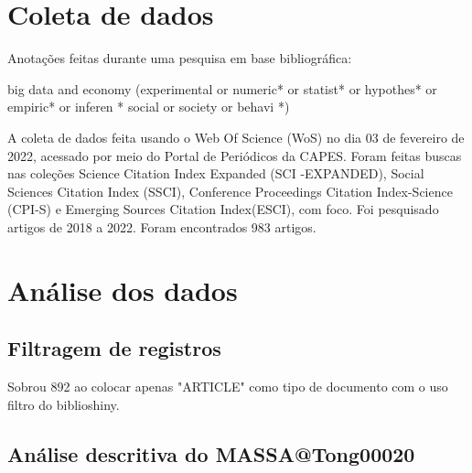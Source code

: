 \section{Coleta de dados}

Anotações feitas durante uma pesquisa em base bibliográfica:

big data and economy (experimental  or  numeric* or  statist* or  hypothes* or  empiric* or  inferen * social  or  society  or  behavi *)

A coleta de dados feita usando o Web Of Science (WoS) no dia 03 de fevereiro de 2022, acessado por meio do Portal de Periódicos da CAPES. Foram feitas buscas nas coleções Science  Citation  Index  Expanded (SCI -EXPANDED), Social Sciences  Citation  Index (SSCI), Conference Proceedings Citation Index-Science (CPI-S) e Emerging Sources Citation Index(ESCI), com foco.
Foi pesquisado artigos de 2018 a 2022.
Foram encontrados 983 artigos.

\section{Análise dos dados}

\subsection{Filtragem de registros}

Sobrou 892 ao colocar apenas "ARTICLE" como tipo de documento com o uso filtro do biblioshiny.



\subsection{Análise descritiva do %
MASSA@Tong00020}

